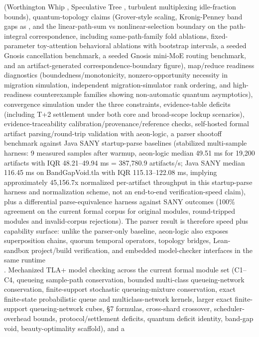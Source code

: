 \documentclass[
]{article}
\begin{document}
\begin{itemize}
  (Worthington Whip , Speculative Tree , turbulent multiplexing
  idle-fraction bounds), quantum-topology claims (Grover-style scaling,
  Kronig-Penney band gaps as , and the linear-path-sum vs
  nonlinear-selection boundary on the path-integral correspondence,
  including same-path-family fold ablations, fixed-parameter
  toy-attention behavioral ablations with bootstrap intervals, a seeded
  Gnosis cancellation benchmark, a seeded Gnosis mini-MoE routing
  benchmark, and an artifact-generated correspondence-boundary figure),
  map/reduce readiness diagnostics (boundedness/monotonicity,
  nonzero-opportunity necessity in migration simulation, independent
  migration-simulator rank ordering, and high-readiness counterexample
  families showing non-automatic quantum asymptotics), convergence
  simulation under the three constraints, evidence-table deficits
  (including T+2 settlement under both core and broad-scope lockup
  scenarios), evidence-traceability calibration/provenance/reference
  checks, self-hosted formal artifact parsing/round-trip validation with
  aeon-logic, a parser shootoff benchmark against Java SANY
  startup-parse baselines (stabilized multi-sample harness: 9 measured
  samples after warmup, aeon-logic median 49.51 ms for 19,200 artifacts
  with IQR 48.21--49.94 ms = 387,780.9 artifacts/s; Java SANY median
  116.45 ms on BandGapVoid.tla with IQR 115.13--122.08 ms, implying
  approximately 45,156.7x normalized per-artifact throughput in this
  startup-parse harness and normalization scheme, not an end-to-end
  verification-speed claim), plus a differential parse-equivalence
  harness against SANY outcomes (100\% agreement on the current formal
  corpus for original modules, round-tripped modules and invalid-corpus
  rejections). The parser result is therefore speed plus capability
  surface: unlike the parser-only baseline, aeon-logic also exposes
  superposition chains, quorum temporal operators, topology bridges,
  Lean-sandbox project/build verification, and embedded model-checker
  interfaces in the same runtime\\
  . Mechanized TLA+ model checking across the current formal module set
  (C1--C4, queueing sample-path conservation, bounded multi-class
  queueing-network conservation, finite-support stochastic
  queueing-mixture conservation, exact finite-state probabilistic queue
  and multiclass-network kernels, larger exact finite-support
  queueing-network cubes, §7 formulas, cross-shard crossover,
  scheduler-overhead bounds, protocol/settlement deficits, quantum
  deficit identity, band-gap void, beauty-optimality scaffold), and a

\end{itemize}
\end{document}
